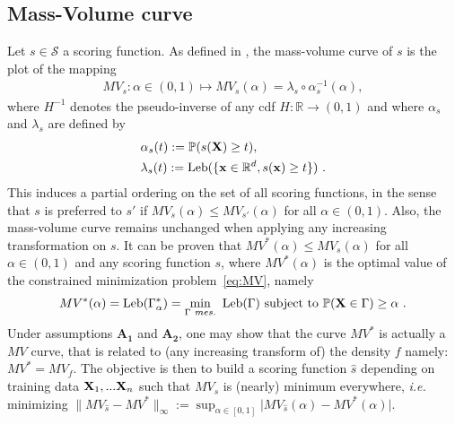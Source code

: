 
\subsection{Mass-Volume curve}
\label{resume:mv-curve}

Let $s\in \mathcal{S}$ a scoring function. As defined in \cite{CLEM13,CLEM14}, the mass-volume curve of $s$ is the plot of the mapping 
\begin{align*}
MV_s : \alpha\in (0,1)\mapsto MV_s(\alpha) = \lambda_s \circ \alpha_s^{-1}(\alpha),
\end{align*}
where $H^{-1}$ denotes the pseudo-inverse of any cdf $H:\mathbb{R}\rightarrow (0,1)$ and where $\alpha_s$ and $\lambda_s$ are defined by
\begin{equation}
\begin{aligned}
\label{eq:alpha_beta}
&\alpha_s(t):= \mathbb{P}(s(\mathbf X) \ge t), \\
&\lambda_s(t):=\text{Leb}(\{\mathbf x \in \mathbb{R}^d, s(\mathbf x) \ge t\})~.
\end{aligned}
\end{equation}
%
This induces a partial ordering on the set of all scoring functions, in the sense that $s$ is
preferred to $s'$ if $MV_{s}(\alpha) \le MV_{s'}(\alpha)$ for all
$\alpha\in(0,1)$. Also, the mass-volume curve remains unchanged when applying any increasing transformation on $s$.
It can be proven that $MV^*(\alpha)\leq MV_s(\alpha)$ for all $\alpha\in (0,1)$ and any scoring function $s$, where $MV^*(\alpha)$ is the optimal value of the constrained minimization problem~\eqref{eq:MV}, namely
%
\begin{align}
\label{def:MV}
MV^*(\alpha)= \text{Leb}(\Gamma_\alpha^*)=\min_{\Gamma~ mes.} ~\text{Leb}(\Gamma) \mbox{~subject to~} \mathbb{P}(\mathbf X \in \Gamma) \ge \alpha~.
\end{align}
%
Under assumptions $\mathbf{A_1}$ and $\mathbf{A_2}$, one may show that the curve $MV^*$ is actually a $MV$ curve, that is related to (any increasing transform of) the density $f$ namely: $MV^*=MV_f$. 
The objective is then to build a scoring function $\hat s$ depending on training data $\mathbf X_1,...\mathbf X_n$ such that $MV_{\hat s}$ is (nearly) minimum everywhere, \textit{i.e.} minimizing $\|MV_{\hat s}-MV^*\|_{\infty}:=\sup_{\alpha\in[0,1]}\vert MV_{\hat s}(\alpha)-MV^*(\alpha)\vert$.

